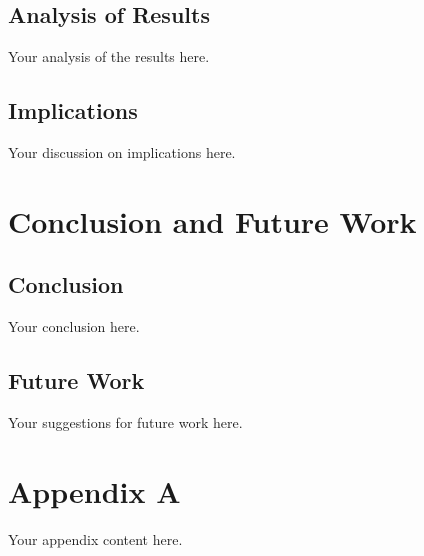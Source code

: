\documentclass[12pt,a4paper]{report}
\begin{document}
\section{Analysis of Results}
Your analysis of the results here.

\section{Implications}
Your discussion on implications here.

\chapter{Conclusion and Future Work}
\section{Conclusion}
Your conclusion here.

\section{Future Work}
Your suggestions for future work here.

\newpage
{}



\appendix
\chapter{Appendix A}
Your appendix content here.
\end{document}
